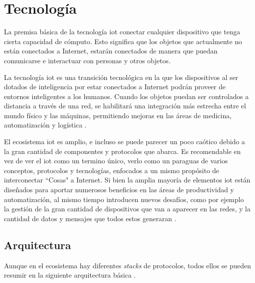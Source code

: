\section{Tecnología }
\label{iot}

La premisa básica de la tecnología \gls{iot} \cite{iotreview} conectar cualquier dispositivo que tenga cierta capacidad de cómputo. Esto significa que los objetos que actualmente no están conectados a Internet, estarán conectados de manera que puedan comunicarse e interactuar con personas y otros objetos. \\
\par

La tecnología \gls{iot} es una transición tecnológica en la que los dispositivos al ser dotados de inteligencia por estar conectados a Internet podrán proveer de entornos inteligentes a los humanos.  Cuando los objetos puedan ser controlados a distancia a través de una red, se habilitará una integración más estrecha entre el mundo físico y las máquinas, permitiendo mejoras en las áreas de medicina, automatización y logística \cite{7073822}.\\
\par

El ecosistema \gls{iot} es amplio, e incluso se puede parecer un poco caótico debido a la gran cantidad de componentes y protocolos que abarca. Es recomendable en vez de ver el \gls{iot} como un termino único, verlo como un paraguas de varios conceptos, protocolos y tecnologías, enfocados a un mismo propósito de interconectar ``Cosas" a Internet. Si bien la amplia mayoría de elementos \gls{iot} están diseñados para aportar numerosos beneficios en las áreas de productividad y automatización, al mismo tiempo introducen nuevos desafíos, como por ejemplo la gestión de la gran cantidad de dispositivos que van a aparecer en las redes, y la cantidad de datos y mensajes que todos estos generaran \cite{iotreview}.

\subsection{Arquitectura}

Aunque en el ecosistema hay diferentes \textit{stacks} de protocolos, todos ellos se pueden resumir en la siguiente arquitectura básica \cite{iotreview}.


